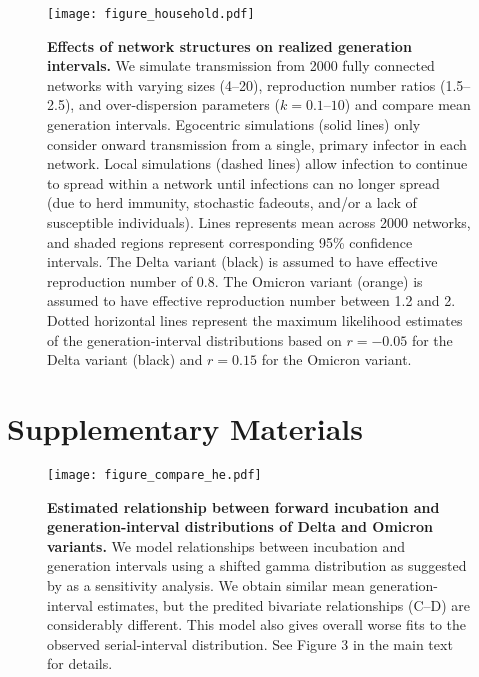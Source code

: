 \documentclass[12pt]{article}
\begin{document}
\pagebreak

\begin{figure}[!th]
\texttt{[image: figure\_household.pdf]}
\caption{
\textbf{Effects of network structures on realized generation intervals.}
We simulate transmission from 2000 fully connected networks with varying sizes (4--20), reproduction number ratios (1.5--2.5), and over-dispersion parameters ($k=0.1$--$10$) and compare mean generation intervals.
Egocentric simulations (solid lines) only consider onward transmission from a single, primary infector in each network.
Local simulations (dashed lines) allow infection to continue to spread within a network until infections can no longer spread (due to herd immunity, stochastic fadeouts, and/or a lack of susceptible individuals).
Lines represents mean across 2000 networks, and shaded regions represent corresponding 95\% confidence intervals.
The Delta variant (black) is assumed to have effective reproduction number of 0.8.
The Omicron variant (orange) is assumed to have effective reproduction number between 1.2 and 2.
Dotted horizontal lines represent the maximum likelihood estimates of the generation-interval distributions based on $r=-0.05$ for the Delta variant (black) and $r=0.15$ for the Omicron variant.
}
\end{figure}


\pagebreak

\section*{Supplementary Materials}

\begin{figure}[!th]
\texttt{[image: figure\_compare\_he.pdf]}
\caption{
\textbf{Estimated relationship between forward incubation and generation-interval distributions of Delta and Omicron variants.}
We model relationships between incubation and generation intervals using a shifted gamma distribution as suggested by \cite{he2020temporal} as a sensitivity analysis.
We obtain similar mean generation-interval estimates, but the predited bivariate relationships (C--D) are considerably different.
This model also gives overall worse fits to the observed serial-interval distribution.
See Figure 3 in the main text for details.
}
\end{figure}


\end{document}
